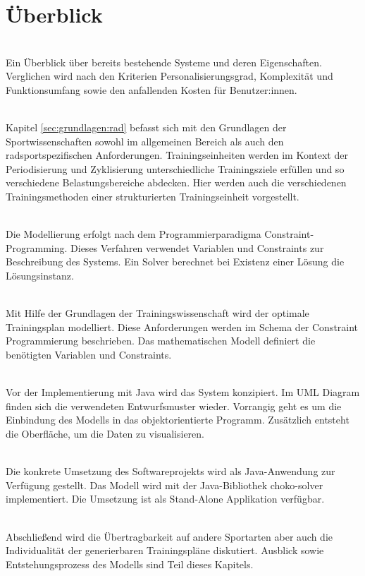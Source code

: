 \section{Überblick}
\label{sec:intro:ueberblick}
\textbf{} \\[0.2em]
Ein Überblick über bereits bestehende Systeme und deren Eigenschaften. Verglichen wird nach den Kriterien Personalisierungsgrad, Komplexität und Funktionsumfang sowie den anfallenden Kosten für Benutzer:innen.

\textbf{} \\[0.2em]
Kapitel \ref{sec:grundlagen:rad} befasst sich mit den Grundlagen der Sportwissenschaften sowohl im allgemeinen Bereich als auch den radsportspezifischen Anforderungen. Trainingseinheiten werden im Kontext der Periodisierung und Zyklisierung unterschiedliche Trainingsziele erfüllen und so verschiedene Belastungsbereiche abdecken. Hier werden auch die verschiedenen Trainingsmethoden einer strukturierten Trainingseinheit vorgestellt.

\textbf{} \\[0.2em]
Die Modellierung erfolgt nach dem Programmierparadigma Constraint-Programming. Dieses Verfahren verwendet Variablen und Constraints zur Beschreibung des Systems. Ein Solver berechnet bei Existenz einer Lösung die Lösungsinstanz. 

\textbf{} \\[0.2em]
Mit Hilfe der Grundlagen der Trainingswissenschaft wird der optimale Trainingsplan modelliert. Diese Anforderungen werden im Schema der Constraint Programmierung beschrieben. Das mathematischen Modell definiert die benötigten Variablen und Constraints.

\textbf{} \\[0.2em]
Vor der Implementierung mit Java wird das System konzipiert. Im UML Diagram finden sich die verwendeten Entwurfsmuster wieder. Vorrangig geht es um die Einbindung des Modells in das objektorientierte Programm. Zusätzlich entsteht die Oberfläche, um die Daten zu visualisieren.

\textbf{} \\[0.2em]
Die konkrete Umsetzung des Softwareprojekts wird als Java-Anwendung zur Verfügung gestellt. Das Modell wird mit der Java-Bibliothek choko-solver implementiert. Die Umsetzung ist als Stand-Alone Applikation verfügbar. 

\textbf{} \\[0.2em]
Abschließend wird die Übertragbarkeit auf andere Sportarten aber auch die Individualität der generierbaren Trainingspläne diskutiert. 
Ausblick sowie Entstehungsprozess des Modells sind Teil dieses Kapitels. 